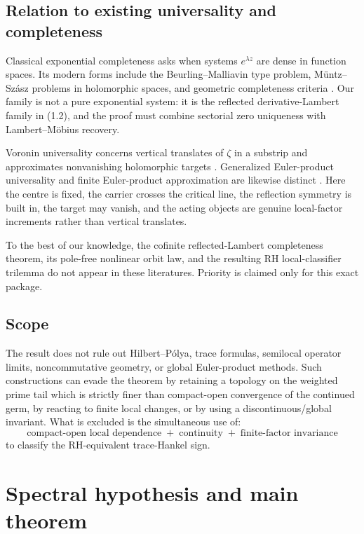 \documentclass[11pt]{article}
\begin{document}
\subsection{Relation to existing universality and completeness}

Classical exponential completeness asks when systems \(e^{\lambda z}\) are dense in
function spaces.  Its modern forms include the Beurling--Malliavin type problem,
M\"untz--Sz\'asz problems in holomorphic spaces, and geometric completeness criteria
\cite{Poltoratski2013,PelosoSalvatori2017,KhabibullinKudasheva2023}.
Our family is not a pure exponential system: it is the reflected
derivative-Lambert family in (1.2), and the proof must combine sectorial zero
uniqueness with Lambert--M\"obius recovery.

Voronin universality concerns vertical translates of \(\zeta\) in a substrip and
approximates nonvanishing holomorphic targets
\cite{Voronin1975,LamzouriLesterRadziwill2018}.  Generalized Euler-product
universality and finite Euler-product approximation are likewise distinct
\cite{Steuding2006,Gonek2007}.  Here the centre is fixed, the carrier crosses the
critical line, the reflection symmetry is built in, the target may vanish, and the
acting objects are genuine local-factor increments rather than vertical translates.

To the best of our knowledge, the cofinite reflected-Lambert completeness theorem,
its pole-free nonlinear orbit law, and the resulting RH local-classifier trilemma do
not appear in these literatures.  Priority is claimed only for this exact package.

\subsection{Scope}

The result does not rule out Hilbert--P\'olya, trace formulas, semilocal operator
limits, noncommutative geometry, or global Euler-product methods.  Such constructions
can evade the theorem by retaining a topology on the weighted prime tail which is
strictly finer than compact-open convergence of the continued germ, by reacting to
finite local changes, or by using a discontinuous/global invariant.  What is excluded
is the simultaneous use of:
\[
 \boxed{
 \text{compact-open local dependence}
 \;+\;
 \text{continuity}
 \;+\;
 \text{finite-factor invariance}
 }
 \tag{1.8}
\]
to classify the RH-equivalent trace-Hankel sign.

\section{Spectral hypothesis and main theorem}
\end{document}
